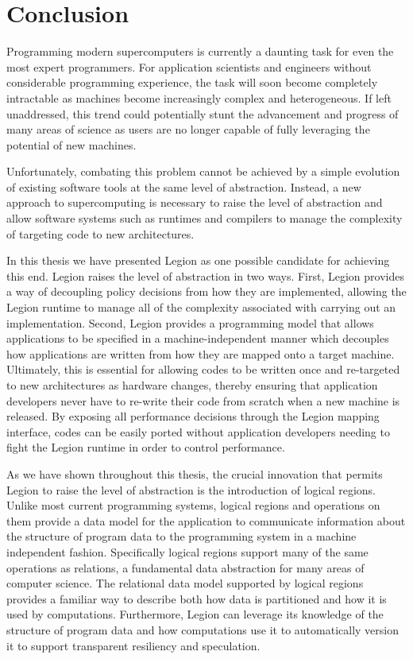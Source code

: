 
\chapter{Conclusion}
\label{chapter:conclusion}

Programming modern supercomputers is currently
a daunting task for even the most expert programmers.
For application scientists and engineers without
considerable programming experience, the task will soon
become completely intractable as machines become increasingly
complex and heterogeneous. If left unaddressed, this trend
could potentially stunt the advancement and progress of 
many areas of science as users are no longer capable of
fully leveraging the potential of new machines.

Unfortunately, combating this problem cannot be achieved
by a simple evolution of existing software tools at the
same level of abstraction. Instead, a new
approach to supercomputing is necessary
to raise the level of abstraction and allow software
systems such as runtimes and compilers to manage the 
complexity of targeting code to new architectures.

In this thesis we have presented Legion as one possible
candidate for achieving this end. Legion raises the level
of abstraction in two ways. First, Legion provides a way
of decoupling policy decisions from how they are implemented,
allowing the Legion runtime to manage all of the complexity
associated with carrying out an implementation. Second,
Legion provides a programming model that allows applications
to be specified in a machine-independent manner which 
decouples how applications are written from how they are
mapped onto a target machine. Ultimately, this is essential
for allowing codes to be written once and re-targeted to
new architectures as hardware changes, thereby ensuring
that application developers never have to re-write their
code from scratch when a new machine is released. By exposing
all performance decisions through the Legion mapping 
interface, codes can be easily ported without application 
developers needing to fight the Legion runtime in
order to control performance.

As we have shown throughout this thesis, the crucial
innovation that permits Legion to raise the level of 
abstraction is the introduction of logical regions. Unlike
most current programming systems, logical regions 
and operations on them provide a data model for the 
application to communicate information about the 
structure of program data to the programming system
in a machine independent fashion. Specifically logical
regions support many of the same operations as relations,
a fundamental data abstraction for many areas of 
computer science. The relational data model supported
by logical regions provides a familiar way to describe
both how data is partitioned and how it is used by
computations. Furthermore, Legion can leverage its
knowledge of the structure of program data and how
computations use it to automatically version it to
support transparent resiliency and speculation. 

